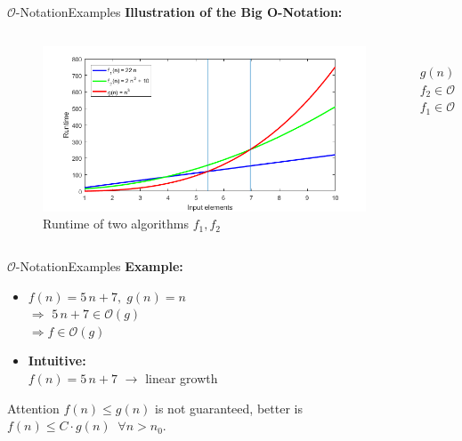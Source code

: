 \begin{frame}{$\mathcal{O}$-Notation}{Examples}
  \textbf{Illustration of the Big O-Notation:}\\[-1.0em]
  \begin{columns}
    \begin{column}{0.9\textwidth}
      \begin{figure}[!h]
        \includegraphics[width=\linewidth]{Images/BigONotationRuntime.png}
        \caption{Runtime of two algorithms $f_1, f_2$}
        \label{fig:big_o_runtime_example}
      \end{figure}
    \end{column}
    \begin{column}{0.1\textwidth}
      \vspace{-4.75em}\\
      \hspace*{-2.5em}$g(n)$\\[2.0em]
      \hspace*{-2.5em}$f_2 \in \mathcal{O}(g)$\\[2.5em]
      \hspace*{-2.5em}$f_1 \in \mathcal{O}(g)$
    \end{column}
  \end{columns}
\end{frame}


\begin{frame}{$\mathcal{O}$-Notation}{Examples}
  \textbf{Example:}
  \begin{itemize}
    \item
      $f(n) = 5 \, n + 7, \; g(n) = n$\\
      $\Rightarrow$ $5 \, n + 7 \in \mathcal{O}(g)$\\
      $\Rightarrow f \in \mathcal{O}(g)$
     \item
      \textbf{Intuitive:}\\
      $f(n) = 5 \, n + 7$ $\rightarrow$ linear growth
  \end{itemize}
  \begin{alertblock}{Attention}
    $f(n) \leq g(n)$ is not guaranteed, better is
    $f(n) \leq C \cdot g(n) \;\; \forall n > n_0$.
  \end{alertblock}
\end{frame}

